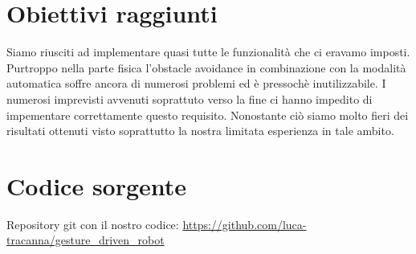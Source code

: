 \documentclass[]{article}
\begin{document}
\pagebreak
\section{Obiettivi raggiunti}

Siamo riusciti ad implementare quasi tutte le funzionalità che ci eravamo imposti. Purtroppo nella parte fisica l'obstacle avoidance
in combinazione con la modalità automatica soffre ancora di numerosi problemi ed è pressochè inutilizzabile.
I numerosi imprevisti avvenuti soprattuto verso la fine ci hanno impedito di impementare correttamente questo requisito.
Nonostante ciò siamo molto fieri dei risultati ottenuti visto soprattutto la nostra limitata esperienza in tale ambito.

\section{Codice sorgente}

Repository git con il nostro codice: \href{https://github.com/luca-tracanna/gesture\_driven\_robot}{https://github.com/luca-tracanna/gesture\_driven\_robot}

\pagebreak
\printbibliography
\end{document}
